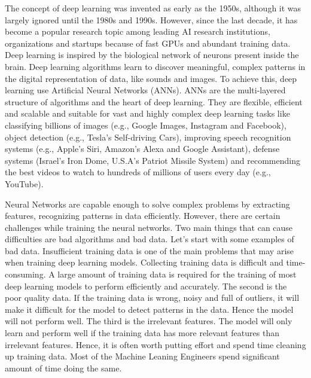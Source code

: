 The concept of deep learning was invented as early as the 1950s, although it was largely ignored until the 1980s and 1990s. However, since the last decade, it has become a popular research topic among leading \ac{AI} research institutions, organizations and startups because of fast GPUs and abundant training data. Deep learning is inspired by the biological network of neurons present inside the brain. Deep learning algorithms learn to discover meaningful, complex patterns in the digital representation of data, like sounds and images. To achieve this, deep learning use Artificial Neural Networks (\acp{ANN}). \acp{ANN} are the multi-layered structure of algorithms and the heart of deep learning. They are flexible, efficient and scalable and suitable for vast and highly complex deep learning tasks like classifying billions of images (e.g., Google Images, Instagram and Facebook), object detection (e.g., Tesla's Self-driving Cars), improving speech recognition systems (e.g., Apple's Siri, Amazon's Alexa and Google Assistant), defense systems (Israel's Iron Dome, U.S.A's Patriot Missile System) and recommending the best videos to watch to hundreds of millions of users every day (e.g., YouTube).

Neural Networks are capable enough to solve complex problems by extracting features, recognizing patterns in data efficiently. However, there are certain challenges while training the neural networks. Two main things that can cause difficulties are bad algorithms and bad data. Let's start with some examples of bad data. Insufficient training data is one of the main problems that may arise when training deep learning models. Collecting training data is difficult and time-consuming. A large amount of training data is required for the training of most deep learning models to perform efficiently and accurately. The second is the poor quality data. If the training data is wrong, noisy and full of outliers, it will make it difficult for the model to detect patterns in the data. Hence the model will not perform well. The third is the irrelevant features. The model will only learn and perform well if the training data has more relevant features than irrelevant features. Hence, it is often worth putting effort and spend time cleaning up training data. Most of the Machine Leaning Engineers spend significant amount of time doing the same. 




